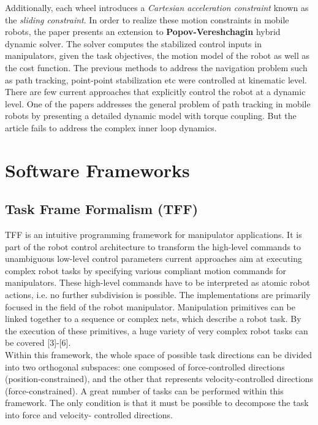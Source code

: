 Additionally, each wheel introduces a \textit{Cartesian acceleration constraint} known as the \textit{sliding constraint}. In order to realize these motion constraints in mobile robots, the paper presents an extension to \textbf{Popov-Vereshchagin} hybrid dynamic solver. The solver computes the stabilized control inputs in manipulators, given the task objectives, the motion model of the robot as well as the cost function. The previous methods to address the navigation problem such as path tracking, point-point stabilization etc were controlled at kinematic level. There are few current approaches that explicitly control the robot at a dynamic level. One of the papers addresses the general problem of path tracking in mobile robots by presenting a detailed dynamic model with torque coupling. But the article fails to address the complex inner loop dynamics.


\section{Software Frameworks}

\subsection{Task Frame Formalism (TFF)}

TFF is an intuitive programming framework for manipulator applications. It is part of the robot control architecture to transform the high-level commands to unambiguous low-level control parameters current approaches aim at executing complex robot tasks by specifying various compliant motion commands for manipulators. These high-level commands have to be interpreted as atomic robot actions, i.e. no further subdivision is possible. The implementations are primarily focused in the field of the robot manipulator. Manipulation primitives can be linked together to a sequence or complex nets, which describe a robot task. By the execution of these primitives, a huge variety of very complex robot tasks can be covered [3]-[6]. \\ 
Within this framework, the whole space of possible task directions can be divided into two orthogonal subspaces: one composed of force-controlled directions (position-constrained), and the other that represents velocity-controlled directions (force-constrained). A great number of tasks can be performed within this framework. The only condition is that it must be possible to decompose the task into force and velocity- controlled directions. \\ 

